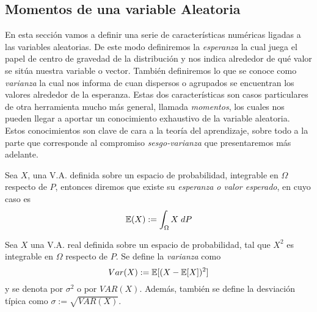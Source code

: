    
   
\subsection{Momentos de una variable Aleatoria}
    
    En esta sección vamos a definir una serie de características numéricas ligadas a las variables aleatorias. De este modo definiremos la \textit{esperanza} la cual juega el papel de centro de gravedad de la distribución y nos indica alrededor de qué valor se sitúa nuestra variable o vector. También definiremos lo que se conoce como \textit{varianza} la cual nos informa de cuan dispersos o agrupados se encuentran los valores alrededor de la esperanza. Estas dos características son casos particulares de otra herramienta mucho más general, llamada \textit{momentos}, los cuales nos pueden llegar a aportar un conocimiento exhaustivo de la variable aleatoria. Estos conocimientos son clave de cara a la teoría del aprendizaje, sobre todo a la parte que corresponde al compromiso \textit{sesgo-varianza} que presentaremos más adelante. 
    
    
    \begin{definicion}
    Sea $X$, una V.A. definida sobre un espacio de probabilidad, integrable en $\Omega$ respecto de $P$, entonces diremos que existe su \textit{esperanza o valor esperado}, en cuyo caso es
    \begin{equation}
        \mathbb{E}(X) := \int_{\Omega} X \; dP
    \end{equation}
    \end{definicion}
    
    
    \begin{definicion}
    Sea $X$ una V.A. real definida sobre un espacio de probabilidad, tal que $X^2$ es integrable en $\Omega$ respecto de $P$. Se define la \textit{varianza} como 
    $$Var(X) := \mathbb{E}[(X-\mathbb{E}[X])^2]$$
    \noindent y se denota por $\sigma^2$ o por $VAR(X)$. Además, también se define la desviación típica como $\sigma:= \sqrt{VAR(X)}$. 
    \end{definicion}
    
